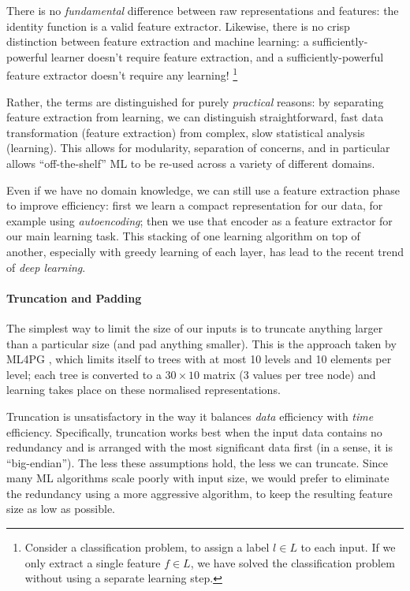 There is no \emph{fundamental} difference between raw representations and
features: the identity function is a valid feature extractor. Likewise, there is
no crisp distinction between feature extraction and machine learning: a
sufficiently-powerful learner doesn't require feature extraction, and a
sufficiently-powerful feature extractor doesn't require any learning!
\footnote{Consider a classification problem, to assign a label $l \in L$ to each
  input. If we only extract a single feature $f \in L$, we have solved the
  classification problem without using a separate learning step.}

Rather, the terms are distinguished for purely \emph{practical} reasons: by
separating feature extraction from learning, we can distinguish straightforward,
fast data transformation (feature extraction) from complex, slow statistical
analysis (learning). This allows for modularity, separation of concerns, and in
particular allows ``off-the-shelf'' ML to be re-used across a variety of
different domains.

Even if we have no domain knowledge, we can still use a feature extraction phase
to improve efficiency: first we learn a compact representation for our data, for
example using \emph{autoencoding}; then we use that encoder as a feature
extractor for our main learning task. This stacking of one learning algorithm on
top of another, especially with greedy learning of each layer, has lead to the
recent trend of \emph{deep learning}.

\paragraph{Truncation and Padding}

The simplest way to limit the size of our inputs is to truncate anything larger
than a particular size (and pad anything smaller). This is the approach taken by
ML4PG \cite{journals/corr/abs-1302-6421}, which limits itself to trees with at
most 10 levels and 10 elements per level; each tree is converted to a
$30 \times 10$ matrix (3 values per tree node) and learning takes place on these
normalised representations.

Truncation is unsatisfactory in the way it balances \emph{data} efficiency with
\emph{time} efficiency. Specifically, truncation works best when the input data
contains no redundancy and is arranged with the most significant data first (in
a sense, it is ``big-endian''). The less these assumptions hold, the less we can
truncate. Since many ML algorithms scale poorly with input size, we would prefer
to eliminate the redundancy using a more aggressive algorithm, to keep the
resulting feature size as low as possible.

